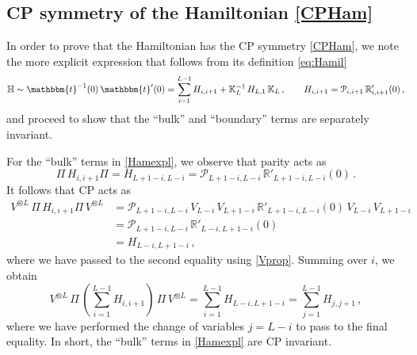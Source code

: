 \documentclass[12pt]{article}
\numberwithin{equation}{section}
\begin{document}
\subsection{CP symmetry of the Hamiltonian \eqref{CPHam}}

In order to prove that the Hamiltonian has the CP symmetry \eqref{CPHam}, we note the more explicit expression that follows from its definition \eqref{eq:Hamil} 
\begin{equation}
    \mathbb{H} \sim \mathbbm{t}^{-1}(0)\, \mathbbm{t}'(0) = \sum_{i=1}^{L-1} H_{i,i+1} +  \mathbb{K}^{-1}_L\, H_{L,1}\, \mathbb{K}_L \,, \qquad H_{i,i+1} = \mathcal{P}_{i,i+1}\, \mathbb{R}'_{i,i+1}(0) \,,
    \label{Hamexpl}
\end{equation}
and proceed to show that the ``bulk'' and ``boundary'' terms are separately invariant.

For the ``bulk'' terms in \eqref{Hamexpl}, we observe that parity acts as
\begin{equation}
    \Pi\, H_{i,i+1} \Pi = H_{L+1-i,L-i} = \mathcal{P}_{L+1-i,L-i}\, \mathbb{R}'_{L+1-i,L-i}(0) \,.
\end{equation}
It follows that CP acts as 
\begin{align}
  V^{\otimes L}\, \Pi\, H_{i,i+1} \Pi\, V^{\otimes L} &= \mathcal{P}_{L+1-i,L-i}\, V_{L-i}\, V_{L+1-i}\,\mathbb{R}'_{L+1-i,L-i}(0)\,  V_{L-i}\,  V_{L+1-i} \nonumber \\
  &= \mathcal{P}_{L+1-i,L-i}\,\mathbb{R}'_{L-i,L+1-i}(0)\,  \nonumber \\
  &= H_{L-i,L+1-i}\,,
\end{align}
where we have passed to the second equality using \eqref{Vprop}. Summing over $i$, we obtain
\begin{equation}
    V^{\otimes L}\, \Pi\, \left(\sum_{i=1}^{L-1} H_{i,i+1} \right)\, \Pi\, V^{\otimes L} = \sum_{i=1}^{L-1} H_{L-i,L+1-i} = \sum_{j=1}^{L-1} H_{j,j+1}\,,
\end{equation}
where we have performed the change of variables $j=L-i$
to pass to the final equality. In short, the ``bulk'' terms in \eqref{Hamexpl} are CP invariant.
\end{document}
